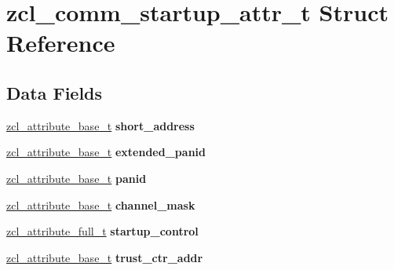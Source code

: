 \hypertarget{structzcl__comm__startup__attr__t}{\section{zcl\-\_\-comm\-\_\-startup\-\_\-attr\-\_\-t Struct Reference}
\label{structzcl__comm__startup__attr__t}
}
\subsection*{Data Fields}
\begin{DoxyCompactItemize}
\item 
\hypertarget{group__zcl__commissioning_ga09358262028164dbac87cc4761d2c105}{\hyperlink{structzcl__attribute__base__t}{zcl\-\_\-attribute\-\_\-base\-\_\-t} {\bfseries short\-\_\-address}}\label{group__zcl__commissioning_ga09358262028164dbac87cc4761d2c105}

\item 
\hypertarget{group__zcl__commissioning_gaad692e3365004299f5d4f2de75b28427}{\hyperlink{structzcl__attribute__base__t}{zcl\-\_\-attribute\-\_\-base\-\_\-t} {\bfseries extended\-\_\-panid}}\label{group__zcl__commissioning_gaad692e3365004299f5d4f2de75b28427}

\item 
\hypertarget{group__zcl__commissioning_gac61d07d24f26d714f4f59f5d24d98f75}{\hyperlink{structzcl__attribute__base__t}{zcl\-\_\-attribute\-\_\-base\-\_\-t} {\bfseries panid}}\label{group__zcl__commissioning_gac61d07d24f26d714f4f59f5d24d98f75}

\item 
\hypertarget{group__zcl__commissioning_ga140860fa966bb3bc00ec70b5bba5249f}{\hyperlink{structzcl__attribute__base__t}{zcl\-\_\-attribute\-\_\-base\-\_\-t} {\bfseries channel\-\_\-mask}}\label{group__zcl__commissioning_ga140860fa966bb3bc00ec70b5bba5249f}

\item 
\hypertarget{group__zcl__commissioning_ga12f96692dda7fc225786046f10b27fb9}{\hyperlink{structzcl__attribute__full__t}{zcl\-\_\-attribute\-\_\-full\-\_\-t} {\bfseries startup\-\_\-control}}\label{group__zcl__commissioning_ga12f96692dda7fc225786046f10b27fb9}

\item 
\hypertarget{group__zcl__commissioning_ga02be3f40fa92d31b37974ca96006bb66}{\hyperlink{structzcl__attribute__base__t}{zcl\-\_\-attribute\-\_\-base\-\_\-t} {\bfseries trust\-\_\-ctr\-\_\-addr}}\label{group__zcl__commissioning_ga02be3f40fa92d31b37974ca96006bb66}


\end{DoxyCompactItemize}
